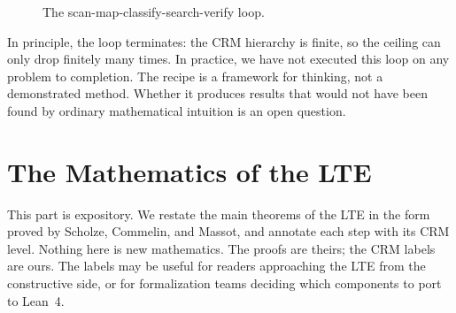 \documentclass[11pt,a4paper]{article}
\theoremstyle{plain}
\theoremstyle{definition}
\newcommand{\CRMlint}{\textsc{CRMlint}}
\begin{document}
\begin{figure}[h]
\centering
{}
\caption{The scan-map-classify-search-verify loop.}
\label{fig:loop}
\end{figure}

In principle, the loop terminates: the CRM hierarchy is finite, so
the ceiling can only drop finitely many times.  In practice, we have
not executed this loop on any problem to completion.  The recipe is
a framework for thinking, not a demonstrated method.  Whether it
produces results that would not have been found by ordinary
mathematical intuition is an open question.


\part{The Mathematics of the LTE}\label{part:math}

This part is expository.  We restate the main theorems of the LTE
in the form proved by Scholze, Commelin, and Massot, and annotate
each step with its CRM level.  Nothing here is new mathematics.
The proofs are theirs; the CRM labels are ours.  The labels may
be useful for readers approaching the LTE from the constructive
side, or for formalization teams deciding which components to
port to Lean~4.
\end{document}
